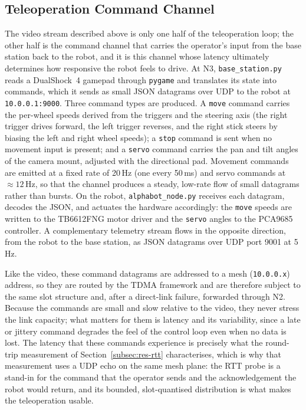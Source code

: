 \subsection{Teleoperation Command Channel}
\label{subsec:cmd-channel}

The video stream described above is only one half of the teleoperation loop; the
other half is the command channel that carries the operator's input from the
base station back to the robot, and it is this channel whose latency ultimately
determines how responsive the robot feels to drive. At N3, \texttt{base\_station.py}
reads a DualShock~4 gamepad through \texttt{pygame} and translates its state into
commands, which it sends as small JSON datagrams over UDP to the robot at
\texttt{10.0.0.1:9000}. Three command types are produced. A \texttt{move}
command carries the per-wheel speeds derived from the triggers and the steering
axis (the right trigger drives forward, the left trigger reverses, and the right
stick steers by biasing the left and right wheel speeds); a \texttt{stop}
command is sent when no movement input is present; and a \texttt{servo} command
carries the pan and tilt angles of the camera mount, adjusted with the
directional pad. Movement commands are emitted at a fixed rate of 20\,Hz (one
every 50\,ms) and servo commands at $\approx 12$\,Hz, so that the channel
produces a steady, low-rate flow of small datagrams rather than bursts. On the
robot, \texttt{alphabot\_node.py} receives each datagram, decodes the JSON, and
actuates the hardware accordingly: the \texttt{move} speeds are written to the
TB6612FNG motor driver and the \texttt{servo} angles to the PCA9685 controller.
A complementary telemetry stream flows in the opposite direction, from the robot
to the base station, as JSON datagrams over UDP port 9001 at 5\,Hz.

Like the video, these command datagrams are addressed to a mesh (\texttt{10.0.0.x})
address, so they are routed by the TDMA framework and are therefore subject to
the same slot structure and, after a direct-link failure, forwarded through N2.
Because the commands are small and slow relative to the video, they never stress
the link capacity; what matters for them is latency and its variability, since a
late or jittery command degrades the feel of the control loop even when no data
is lost. The latency that these commands experience is precisely what the
round-trip measurement of Section~\ref{subsec:res-rtt} characterises, which is
why that measurement uses a UDP echo on the same mesh plane: the RTT probe is a
stand-in for the command that the operator sends and the acknowledgement the
robot would return, and its bounded, slot-quantised distribution is what makes
the teleoperation usable.

